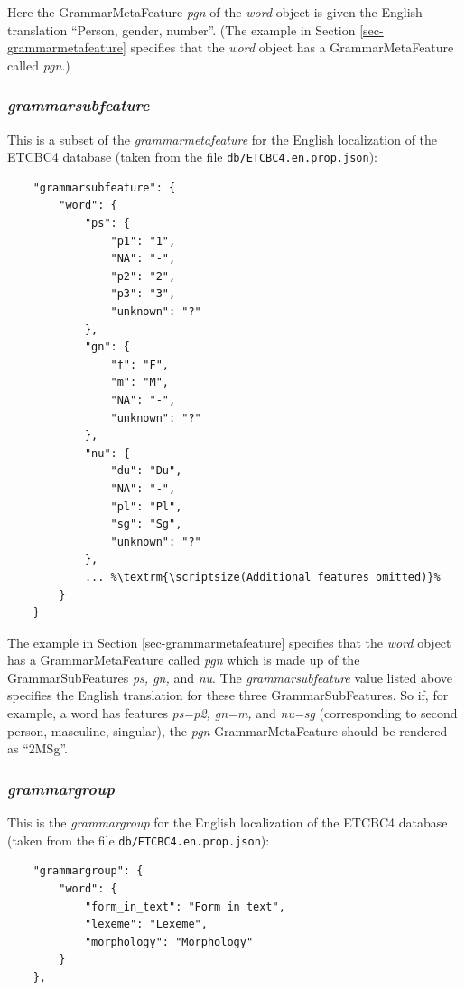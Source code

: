 \documentclass[11pt,oneside,a4paper]{memoir}
\begin{document}
Here the GrammarMetaFeature \emph{pgn} of the \emph{word} object is given the English translation
``Person, gender, number''. (The example in Section \ref{sec-grammarmetafeature} specifies that the \emph{word}
object has a GrammarMetaFeature called \emph{pgn}.)

\subsubsection{\emph{grammarsubfeature}}

This is a subset of the \emph{grammarmetafeature} for the English localization of the
ETCBC4 database (taken from the file \texttt{db/ETCBC4.en.prop.json}):

\begin{lstlisting}
    "grammarsubfeature": {
        "word": {
            "ps": {
                "p1": "1",
                "NA": "-",
                "p2": "2",
                "p3": "3",
                "unknown": "?"
            },
            "gn": {
                "f": "F",
                "m": "M",
                "NA": "-",
                "unknown": "?"
            },
            "nu": {
                "du": "Du",
                "NA": "-",
                "pl": "Pl",
                "sg": "Sg",
                "unknown": "?"
            },
            ... %\textrm{\scriptsize(Additional features omitted)}%
        }
    }
\end{lstlisting}

The example in Section \ref{sec-grammarmetafeature} specifies that the \emph{word} object has a GrammarMetaFeature
called \emph{pgn} which is made up of the GrammarSubFeatures \emph{ps, gn,} and \emph{nu}. The
\emph{grammarsubfeature} value listed above specifies the English translation for these three
GrammarSubFeatures. So if, for example, a word has features \emph{ps=p2, gn=m,} and \emph{nu=sg}
(corresponding to second person, masculine, singular), the \emph{pgn} GrammarMetaFeature should be
rendered as ``2MSg''.


\subsubsection{\emph{grammargroup}}

This is the \emph{grammargroup} for the English localization of the ETCBC4 database (taken from the
file \texttt{db/ETCBC4.en.prop.json}):

\begin{lstlisting}
    "grammargroup": {
        "word": {
            "form_in_text": "Form in text",
            "lexeme": "Lexeme",
            "morphology": "Morphology"
        }
    },
\end{lstlisting}
\end{document}
